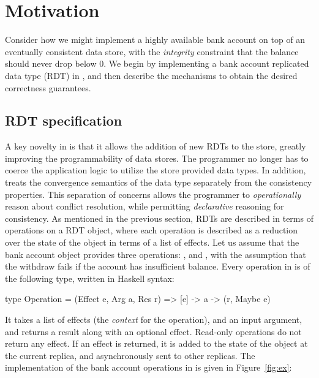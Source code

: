 \section{Motivation}
\label{sec:motivation}

Consider how we might implement a highly available bank account on top of an
eventually consistent data store, with the \emph{integrity} constraint that the
balance should never drop below 0. We begin by implementing a bank
account replicated data type (RDT) in \name, and then describe the mechanisms
to obtain the desired correctness guarantees.

\subsection{RDT specification}

A key novelty in \name is that it allows the addition of new RDTs to the store,
greatly improving the programmability of data stores. The programmer no
longer has to coerce the application logic to utilize the store provided data
types. In addition, \name treats the convergence semantics of the data type
separately from the consistency properties. This separation of concerns allows
the programmer to \emph{operationally} reason about conflict resolution, while
permitting \emph{declarative} reasoning for consistency. As mentioned in the
previous section, RDTs are described in terms of operations on a RDT object,
where each operation is described as a reduction over the state of the object
in terms of a list of effects. Let us assume that the bank account object provides
three operations: ,  and , with the
assumption that the withdraw fails if the account has insufficient balance.
Every operation in \name is of the following type, written in Haskell syntax:

\begin{codehaskell}
type Operation = (Effect e, Arg a, Res r)
               => [e] -> a -> (r, Maybe e)
\end{codehaskell}

\noindent It takes a list of effects (the \emph{context} for the operation),
and an input argument, and returns a result along with an optional effect. Read-only
operations do not return any effect. If an effect is returned, it is added to
the state of the object at the current replica, and asynchronously sent to
other replicas. The implementation of the bank account operations in \name is
given in Figure~\ref{fig:ex}:

